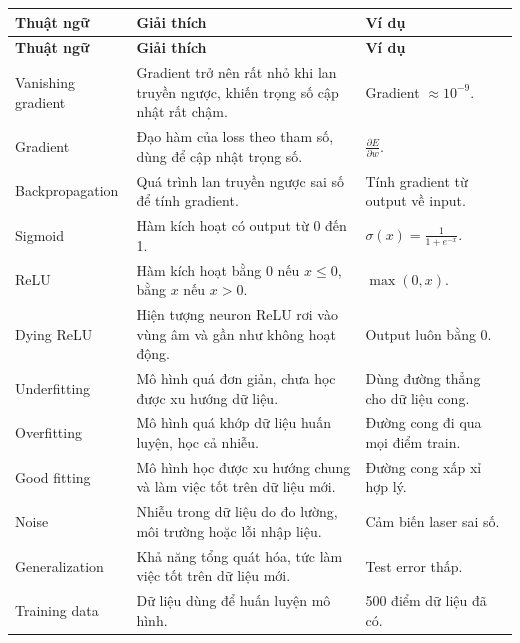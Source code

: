\small
\begin{longtable}{p{}p{}p{}}
\toprule
\textbf{Thuật ngữ} & \textbf{Giải thích} & \textbf{Ví dụ} \\
\midrule
\endfirsthead

\toprule
\textbf{Thuật ngữ} & \textbf{Giải thích} & \textbf{Ví dụ} \\
\midrule
\endhead

Vanishing gradient & Gradient trở nên rất nhỏ khi lan truyền ngược, khiến trọng số cập nhật rất chậm. & Gradient $\approx 10^{-9}$. \\

Gradient & Đạo hàm của loss theo tham số, dùng để cập nhật trọng số. & $\frac{\partial E}{\partial w}$. \\

Backpropagation & Quá trình lan truyền ngược sai số để tính gradient. & Tính gradient từ output về input. \\

Sigmoid & Hàm kích hoạt có output từ 0 đến 1. & $\sigma(x)=\frac{1}{1+e^{-x}}$. \\

ReLU & Hàm kích hoạt bằng 0 nếu $x\leq 0$, bằng $x$ nếu $x>0$. & $\max(0,x)$. \\

Dying ReLU & Hiện tượng neuron ReLU rơi vào vùng âm và gần như không hoạt động. & Output luôn bằng 0. \\

Underfitting & Mô hình quá đơn giản, chưa học được xu hướng dữ liệu. & Dùng đường thẳng cho dữ liệu cong. \\

Overfitting & Mô hình quá khớp dữ liệu huấn luyện, học cả nhiễu. & Đường cong đi qua mọi điểm train. \\

Good fitting & Mô hình học được xu hướng chung và làm việc tốt trên dữ liệu mới. & Đường cong xấp xỉ hợp lý. \\

Noise & Nhiễu trong dữ liệu do đo lường, môi trường hoặc lỗi nhập liệu. & Cảm biến laser sai số. \\

Generalization & Khả năng tổng quát hóa, tức làm việc tốt trên dữ liệu mới. & Test error thấp. \\

Training data & Dữ liệu dùng để huấn luyện mô hình. & 500 điểm dữ liệu đã có. \\


\end{longtable}
